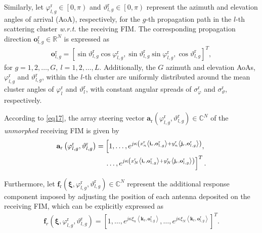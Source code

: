 \documentclass[lettersize,journal]{IEEEtran}
\begin{document}
Similarly, let $\varphi _{l,g}^{\textrm{r}}\in \left [ 0,\pi \right )$ and $\vartheta _{l,g}^{\textrm{r}}\in \left [ 0,\pi \right )$ represent the azimuth and elevation angles of arrival (AoA), respectively, for the $g$-th propagation path in the $l$-th scattering cluster \emph{w.r.t.} the receiving FIM. The corresponding propagation direction $\mathbf{o}_{l,g}^{\textrm{r}}\in \mathbb{R}^{N}$ is expressed as
\begin{align}\label{eq17}
 \mathbf{o}_{l,g}^{\textrm{r}} = \left [ \sin\vartheta_{l,g}^{\textrm{r}} \cos\varphi_{l,g}^{\textrm{r}} , \sin\vartheta_{l,g}^{\textrm{r}} \sin\varphi_{l,g}^{\textrm{r}} , \cos\vartheta_{l,g}^{\textrm{r}} \right ] ^{T},
\end{align}
for $g = 1, 2, \ldots, G,\ l = 1, 2, \ldots, L$. Additionally, the $G$ azimuth and elevation AoAs, $\varphi_{l,g}^{\textrm{r}}$ and $\vartheta_{l,g}^{\textrm{r}}$, within the $l$-th cluster are uniformly distributed around the mean cluster angles of $\varphi_{l}^{\textrm{r}}$ and $\vartheta_{l}^{\textrm{r}}$, with constant angular spreads of $\sigma_{\varphi}^{\textrm{r}}$ and $\sigma_{\vartheta}^{\textrm{r}}$, respectively.





According to \eqref{eq17}, the array steering vector $\mathbf{a}_{\textrm{r}}\left ( \varphi_{l,g}^{\textrm{r}}, \vartheta_{l,g}^{\textrm{r}} \right )\in \mathbb{C}^{N}$ of the \emph{unmorphed} receiving FIM is given by
\begin{align}\label{eq18}
 \mathbf{a}_{\textrm{r}}\left ( \varphi_{l,g}^{\textrm{r}} ,\vartheta_{l,g}^{\textrm{r}} \right )=\left [ 1,\ldots , e^{j\kappa \left ( x_{n}^{\textrm{r}}\left \langle \mathbf{i}_{\textrm{r}},\mathbf{o}_{l,g}^{\textrm{r}} \right \rangle+y_{n}^{\textrm{r}}\left \langle \mathbf{j}_{\textrm{r}},\mathbf{o}_{l,g}^{\textrm{r}} \right \rangle \right )}, \right.\notag\\
\left. \ldots ,e^{j\kappa \left ( x_{N}^{\textrm{r}}\left \langle \mathbf{i}_{\textrm{r}},\mathbf{o}_{l,g}^{\textrm{r}} \right \rangle +y_{N}^{\textrm{r}}\left \langle \mathbf{j}_{\textrm{r}},\mathbf{o}_{l,g}^{\textrm{r}} \right \rangle \right )} \right ]^{T}.
\end{align}


Furthermore, let $\mathbf{f}_{\textrm{r}} \left ( \boldsymbol{\xi}, \varphi_{l,g}^{\textrm{r}} ,\vartheta_{l,g}^{\textrm{r}} \right ) \in \mathbb{C}^{N}$ represent the additional response component imposed by adjusting the position of each antenna deposited on the receiving FIM, which can be explicitly expressed as
\begin{align}\label{eq19}
 \mathbf{f}_r\left ( \boldsymbol{\xi}, \varphi_{l,g}^{\textrm{r}}, \vartheta_{l,g}^{\textrm{r}} \right ) = \left [ 1,\ldots , e^{j\kappa \xi_{n}\left \langle \mathbf{k}_{\textrm{r}},\mathbf{o}_{l,g}^{\textrm{r}} \right \rangle }, \ldots ,e^{j\kappa \xi_{N}\left \langle \mathbf{k}_{\textrm{r}},\mathbf{o}_{l,g}^{\textrm{r}} \right \rangle } \right ]^{T}. 
\end{align}
\end{document}
